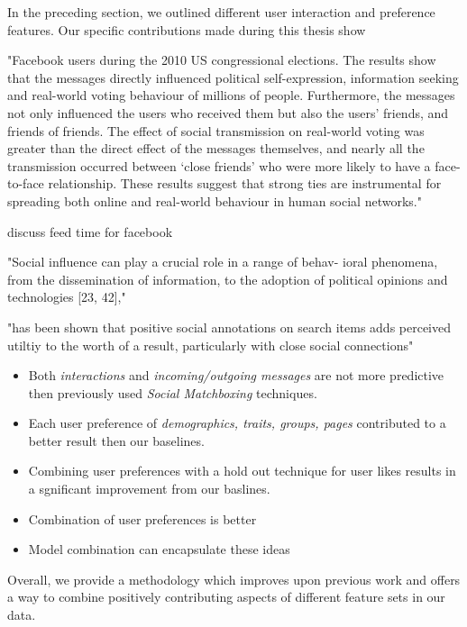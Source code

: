 In the preceding section, we outlined different user interaction and preference features. Our specific contributions made during this thesis show 


"Facebook users during the 2010 US congressional elections. The results show that the messages directly influenced political
self-expression, information seeking and real-world voting behaviour of millions of people. Furthermore, the messages not only 
influenced the users who received them but also the users’ friends, and friends of friends. The effect of social transmission on real-world
voting was greater than the direct effect of the messages themselves, and nearly all the transmission occurred between ‘close friends’
who were more likely to have a face-to-face relationship. These results suggest that strong ties are instrumental for spreading both
online and real-world behaviour in human social networks."
~\cite{nature}


discuss feed time for facebook

"Social inﬂuence can play a crucial role in a range of behav-
ioral phenomena, from the dissemination of information, to
the adoption of political opinions and technologies [23, 42],"
~\cite{grano}
~\cite{watts}


"has been shown that positive social annotations on search items adds perceived utiltiy to the worth of a result, particularly with close social
connections"
~\cite{pantel}






\begin{itemize}
\item Both \emph{interactions} and \emph{incoming/outgoing messages} are not more predictive then previously used \emph{Social Matchboxing} 
techniques.
\item Each user preference of \emph{demographics, traits, groups, pages} contributed to a better result then our baselines.
\item Combining user preferences with a hold out technique for user likes results in a sgnificant improvement from our baslines.
\item Combination of user preferences is better
\item Model combination can encapsulate these ideas
\end{itemize} 

Overall, we provide a methodology which improves upon previous work and offers a way to combine positively contributing aspects of different 
feature sets in our data.

